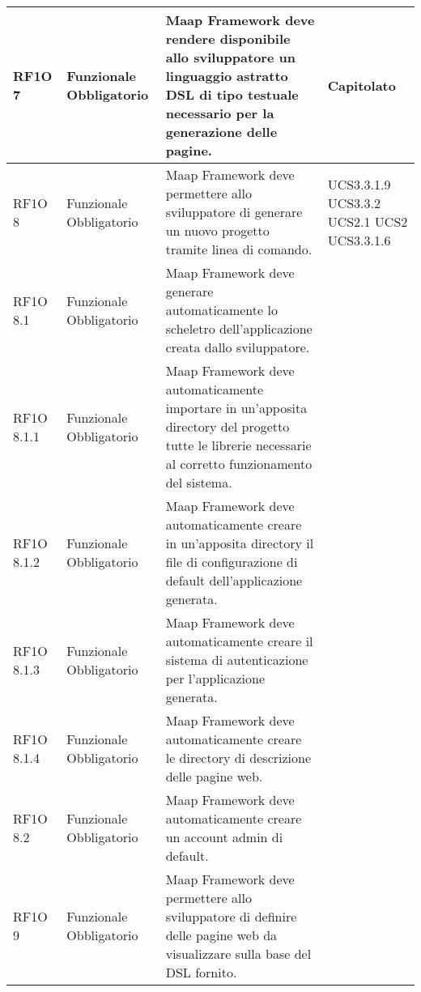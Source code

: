 \begin{center}
\begin{longtable}{ | p{2cm} | p{2cm} | p{5cm} | p{2cm} |}
        RF1O 7 & Funzionale \newline  Obbligatorio  & Maap Framework deve rendere disponibile allo sviluppatore un linguaggio astratto DSL di tipo testuale necessario per la generazione delle pagine. &  Capitolato \newline  \\ \hline      
        RF1O 8  & Funzionale \newline  Obbligatorio  & Maap Framework deve permettere allo sviluppatore di generare un nuovo progetto tramite linea di comando.
 &  UCS3.3.1.9 \newline  UCS3.3.2 \newline  UCS2.1 \newline  UCS2 \newline  UCS3.3.1.6 \newline  \\ \hline      
        RF1O 8.1  & Funzionale \newline  Obbligatorio  & Maap Framework deve generare automaticamente lo scheletro dell'applicazione creata dallo sviluppatore.
 &  \\ \hline      
        RF1O 8.1.1  & Funzionale \newline  Obbligatorio  & Maap Framework deve automaticamente importare in un'apposita directory del progetto tutte le librerie necessarie al corretto funzionamento del sistema.
 &  \\ \hline      
        RF1O 8.1.2 & Funzionale \newline  Obbligatorio  & Maap Framework deve automaticamente creare in un'apposita directory il file di configurazione di default dell'applicazione generata.
 &  \\ \hline      
        RF1O 8.1.3  & Funzionale \newline  Obbligatorio  & Maap Framework deve automaticamente creare il sistema di autenticazione per l'applicazione generata. &  \\ \hline      
        RF1O 8.1.4  & Funzionale \newline  Obbligatorio  & Maap Framework deve automaticamente creare le directory di descrizione delle pagine web.
 &  \\ \hline      
        RF1O 8.2  & Funzionale \newline  Obbligatorio  & Maap Framework deve automaticamente creare un account admin di default. &  \\ \hline      
        RF1O 9  & Funzionale \newline  Obbligatorio  & Maap Framework deve permettere allo sviluppatore di definire delle pagine web da visualizzare sulla base del DSL fornito.

\end{longtable}
\end{center}
